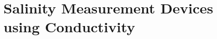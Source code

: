 \section{Salinity Measurement Devices using Conductivity}\label{sec:salinity-measurement-devices}

%
%
%
%
%
%
%
%
%
%
%
%
%
%
%
%
%
%
%
%
%
%
%

